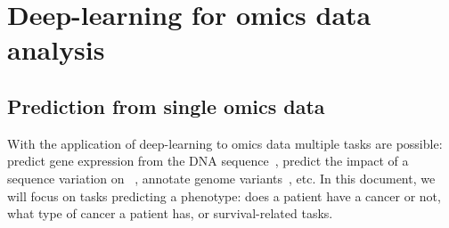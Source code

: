 \documentclass[../main.tex]{subfiles}
\begin{document}
\chapter{Deep-learning for omics data analysis}\label{chap:sota}
\minitocpagecentered

\section{Prediction from single omics data}
	With the application of deep-learning to omics data multiple tasks are possible: predict gene expression from the DNA sequence~\cite{Avsec2021}, predict the impact of a sequence variation on ~\cite{Zeng2017}, annotate genome variants~\cite{Quang2014}, etc\@.
	In this document, we will focus on tasks predicting a phenotype: does a patient have a cancer or not, what type of cancer a patient has, or survival-related tasks.
\end{document}
